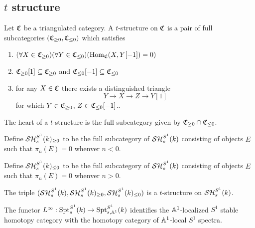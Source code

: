 \documentclass{amsart}%
\begin{document}
\subsection{$t$ structure}

\begin{definition}
  Let $\mathfrak{C}$ be a triangulated category. A $t$-structure on $\mathfrak{C}$
  is a pair of full subcategories $(\mathfrak{C}_{\geq 0}, \mathfrak{C}_{\leq 0})$
  which satisfies 
  \begin{enumerate}
      \item
    $(\forall X \in \mathfrak{C}_{\geq 0}) (\forall Y \in \mathfrak{C}_{\leq 0})(
    \operatorname{Hom}_{\mathfrak{C}}(X, Y[-1])=0)$
      \item $\mathfrak{C}_{\geq 0}[1] \subseteq \mathfrak{C}_{\geq 0}$ and
    $\mathfrak{C}_{\leq 0}[-1] \subseteq \mathfrak{C}_{\leq 0}$ 

      \item for any $X \in \mathfrak{C}$ there exists a distinguished triangle 
    \begin{equation*}
      Y \to X \to Z \to Y[1]
    \end{equation*}
    for which $Y \in \mathfrak{C}_{\geq 0}$, $Z\in \mathfrak{C}_{\leq 0}[-1]$..
  \end{enumerate}

  The heart of a $t$-structure is the full subcategory given by
  $\mathfrak{C}_{\geq 0} \cap \mathfrak{C}_{\leq 0}$. 
\end{definition}


\begin{definition}[$t$-structure on $\SH_s^{S^1}(k)$]
  Define $\mathcal{SH}_s^{S^1}(k)_{\geq 0}$ to be the full subcategory of
  $\SH_s^{S^1}(k)$ consisting of objects $E$ such that $\pi_n(E)=0$
  whenver $n<0$.
  
  Define $\mathcal{SH}_s^{S^1}(k)_{\leq 0}$ to be the full subcategory of
  $\SH_s^{S^1}(k)$ consisting of objects $E$ such that $\pi_n(E)=0$
  whenver $n>0$.
\end{definition}

\begin{theorem}
  The triple
  $(\mathcal{SH}_s^{S^1}(k), \mathcal{SH}_s^{S^1}(k)_{\geq 0}, \mathcal{SH}_s^{S^1}(k)_{\leq 0})$
  is a $t$-structure on $\SH_s^{S^1}(k)$. 
\end{theorem}


\begin{proposition}\cite[Lemma4.2.4]{Mor03}
  The functor
  $L^{\infty} : \mathrm{Spt}^{S^1}_s(k) \to \mathrm{Spt}^{S^1}_{s,\mathbb{A}^1}(k)$
  identifies the $\mathbb{A}^1$-localized $S^1$ stable homotopy category
  with the homotopy category of $\mathbb{A}^1$-local $S^1$ spectra.
\end{proposition}
\end{document}
